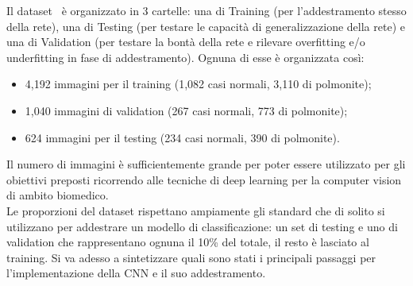 Il dataset~\cite{dspneum} è organizzato in 3 cartelle: una di Training (per l'addestramento stesso della rete), una di Testing (per testare le capacità di generalizzazione della rete) e una di Validation (per testare la bontà della rete e rilevare overfitting e/o underfitting in fase di addestramento). Ognuna di esse è organizzata così: 
\begin{itemize}
    \item 4,192 immagini per il training (1,082 casi normali, 3,110 di polmonite);
    \item 1,040 immagini di validation (267 casi normali, 773 di polmonite);
    \item 624 immagini per il testing (234 casi normali, 390 di polmonite). 
\end{itemize}
Il numero di immagini è sufficientemente grande per poter essere utilizzato per gli obiettivi preposti ricorrendo alle tecniche di deep learning per la computer vision di ambito biomedico. \\
Le proporzioni del dataset rispettano ampiamente gli standard che di solito si utilizzano per addestrare un modello di classificazione: un set di testing e uno di validation che rappresentano ognuna il 10\% del totale, il resto è lasciato al training.
Si va adesso a sintetizzare quali sono stati i principali passaggi per l’implementazione della CNN e il suo addestramento.

